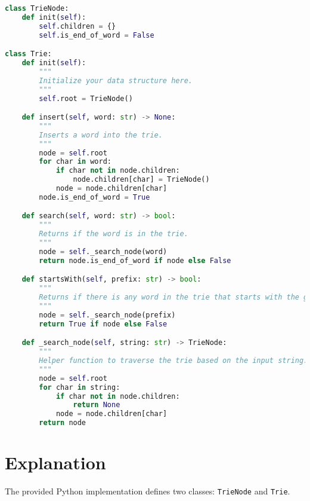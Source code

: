 \begin{fullwidth}
\begin{lstlisting}[language=Python]
class TrieNode:
    def init(self):
        self.children = {}
        self.is_end_of_word = False

class Trie:
    def init(self):
        """
        Initialize your data structure here.
        """
        self.root = TrieNode()

    def insert(self, word: str) -> None:
        """
        Inserts a word into the trie.
        """
        node = self.root
        for char in word:
            if char not in node.children:
                node.children[char] = TrieNode()
            node = node.children[char]
        node.is_end_of_word = True

    def search(self, word: str) -> bool:
        """
        Returns if the word is in the trie.
        """
        node = self._search_node(word)
        return node.is_end_of_word if node else False

    def startsWith(self, prefix: str) -> bool:
        """
        Returns if there is any word in the trie that starts with the given prefix.
        """
        node = self._search_node(prefix)
        return True if node else False

    def _search_node(self, string: str) -> TrieNode:
        """
        Helper function to traverse the trie based on the input string.
        """
        node = self.root
        for char in string:
            if char not in node.children:
                return None
            node = node.children[char]
        return node
\end{lstlisting}
\end{fullwidth}

\section*{Explanation}

The provided Python implementation defines two classes: \texttt{TrieNode} and \texttt{Trie}.

